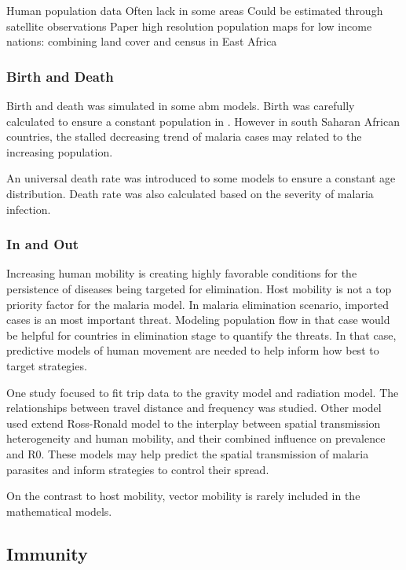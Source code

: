 \documentclass[a4paper, 12pt, twoside]{article}
\begin{document}
Human population data
Often lack in some areas
Could be estimated through satellite observations
Paper high resolution population maps for low income nations: combining land cover and census in East Africa

\subsubsection{Birth and Death}
Birth and death was simulated in some \gls{abm} models.
Birth was carefully calculated to ensure a constant population in .
However in south Saharan African countries, the stalled decreasing trend of malaria cases may related to the increasing population.

An universal death rate was introduced to some models  to ensure a constant age distribution. Death rate was also calculated based on the severity of malaria infection.

\subsubsection{In and Out}
Increasing human mobility is creating highly favorable conditions for the persistence of diseases being targeted for elimination.
Host mobility is not a top priority factor for the malaria model.
In malaria elimination scenario, imported cases is an most important threat.
Modeling population flow in that case would be helpful for countries in elimination stage to quantify the threats.
In that case, predictive models of human movement are needed to help inform how best to target strategies.

One study focused to fit trip data to the gravity model and radiation model\cite{Marshall2018}.
The relationships between travel distance and frequency was studied.
Other model\cite{acevedo_spatial_2015} used extend Ross-Ronald model to the interplay between spatial transmission heterogeneity and human mobility, and their combined influence on prevalence and \gls{R0}.
These models may help predict the spatial transmission of malaria parasites and inform strategies to control their spread.

On the contrast to host mobility, vector mobility is rarely included in the mathematical models.

\subsection{Immunity}
\end{document}
